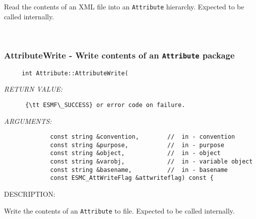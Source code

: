       Read the contents of an XML file into an {\tt Attribute} hierarchy.
      Expected to be called internally.
   
 
\mbox{}\hrulefill\
 
\subsubsection [AttributeWrite] {AttributeWrite - Write contents of an {\tt Attribute} package}


  
\begin{verbatim}     int Attribute::AttributeWrite(\end{verbatim}{\em RETURN VALUE:}
\begin{verbatim}      {\tt ESMF\_SUCCESS} or error code on failure.\end{verbatim}{\em ARGUMENTS:}
\begin{verbatim}             const string &convention,        //  in - convention
             const string &purpose,           //  in - purpose
             const string &object,            //  in - object
             const string &varobj,            //  in - variable object
             const string &basename,          //  in - basename
             const ESMC_AttWriteFlag &attwriteflag) const {\end{verbatim}
{\sf DESCRIPTION:\\ }


      Write the contents of an {\tt Attribute} to file.  Expected to be
      called internally.
  
\setlength{\parskip}{\oldparskip}
\setlength{\parindent}{\oldparindent}
\setlength{\baselineskip}{\oldbaselineskip}
